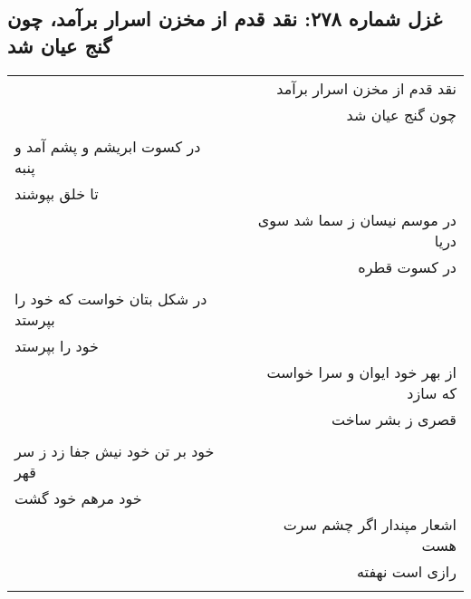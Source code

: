 \begin{center}
\section*{غزل شماره ۲۷۸: نقد قدم از مخزن اسرار برآمد، چون گنج عیان شد}
\label{sec:278}
\begin{longtable}{l p{0.5cm} r}

&&

نقد قدم از مخزن اسرار برآمد
\\

&&
چون گنج عیان شد
\\

&&



\\

در کسوت ابریشم و پشم آمد و پنبه
&&

\\
تا خلق بپوشند
&&

\\



&&

در موسم نیسان ز سما شد سوی دریا
\\

&&
در کسوت قطره
\\

&&


\\

در شکل بتان خواست که خود را بپرستد
&&

\\
خود را بپرستد
&&

\\


&&

از بهر خود ایوان و سرا خواست که سازد
\\

&&
قصری ز بشر ساخت
\\

&&


\\

خود بر تن خود نیش جفا زد ز سر قهر
&&

\\
خود مرهم خود گشت
&&

\\


&&

اشعار مپندار اگر چشم سرت هست
\\

&&
رازی است نهفته
\\

&&
\end{longtable}
\end{center}
